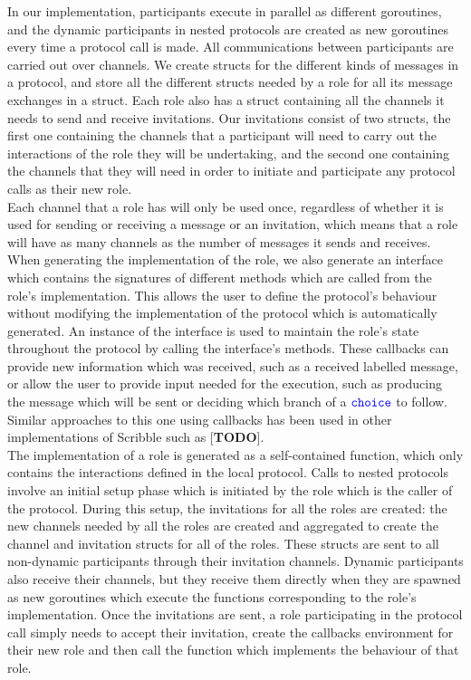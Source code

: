 \documentclass[12pt,twoside]{report}
\begin{document}
In our implementation, participants execute in parallel as different goroutines, and the dynamic participants in nested protocols are created as new goroutines every time a protocol call is made. All communications between participants are carried out over channels. We create structs for the different kinds of messages in a protocol, and store all the different structs needed by a role for all its message exchanges in a struct. Each role also has a struct containing all the channels it needs to send and receive invitations. Our invitations consist of two structs, the first one containing the channels that a participant will need to carry out the interactions of the role they will be undertaking, and the second one containing the channels that they will need in order to initiate and participate any protocol calls as their new role. \\

Each channel that a role has will only be used once, regardless of whether it is used for sending or receiving a message or an invitation, which means that a role will have as many channels as the number of messages it sends and receives.\\

When generating the implementation of the role, we also generate an interface which contains the signatures of different methods which are called from the role's implementation. This allows the user to define the protocol's behaviour without modifying the implementation of the protocol which is automatically generated. An instance of the interface is used to maintain the role's state throughout the protocol by calling the interface's methods. These callbacks can provide new information which was received, such as a received labelled message, or allow the user to provide input needed for the execution, such as producing the message which will be sent or deciding which branch of a ${\color{blue}\mathtt{choice}}$ to follow. Similar approaches to this one using callbacks has been used in other implementations of Scribble such as [\textbf{TODO}].\\

The implementation of a role is generated as a self-contained function, which only contains the interactions defined in the local protocol. Calls to nested protocols involve an initial setup phase which is initiated by the role which is the caller of the protocol. During this setup, the invitations for all the roles are created: the new channels needed by all the roles are created and aggregated to create the channel and invitation structs for all of the roles. These structs are sent to all non-dynamic participants through their invitation channels. Dynamic participants also receive their channels, but they receive them directly when they are spawned as new goroutines which execute the functions corresponding to the role's implementation. Once the invitations are sent, a role participating in the protocol call simply needs to accept their invitation, create the callbacks environment for their new role and then call the function which implements the behaviour of that role.\\
\end{document}
